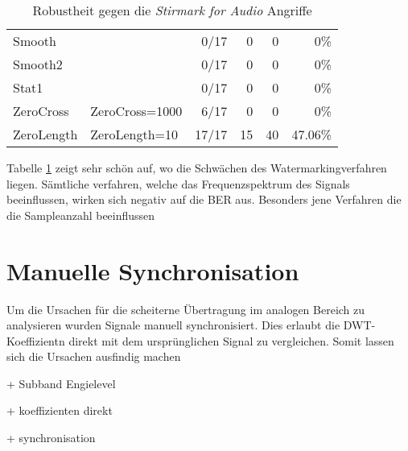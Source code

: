 \begin{table}[h]
\begin{tabular}{llrrrr}
Smooth                               &                                        & 0/17                            & 0                               & 0                                & 0\%                              \\
Smooth2                              &                                        & 0/17                            & 0                               & 0                                & 0\%                              \\
Stat1                                &                                        & 0/17                            & 0                               & 0                                & 0\%                              \\
ZeroCross                            & ZeroCross=1000                         & 6/17                            & 0                               & 0                                & 0\%                              \\
ZeroLength                           & ZeroLength=10                          & 17/17                           & 15                              & 40                               & 47.06\%                          \\ \hline
\end{tabular}

\caption{Robustheit gegen die \textit{Stirmark for Audio} Angriffe}
\label{tab:stirmark}
\end{table}

Tabelle \ref{tab:stirmark} zeigt sehr schön auf, wo die Schwächen des Watermarkingverfahren liegen. Sämtliche verfahren, welche das Frequenzspektrum des Signals beeinflussen, wirken sich negativ auf die BER aus. Besonders jene Verfahren die die Sampleanzahl beeinflussen
 

\section{Manuelle Synchronisation}

Um die Ursachen für die scheiterne Übertragung im analogen Bereich zu analysieren wurden Signale manuell synchronisiert. Dies erlaubt die DWT-Koeffizientn direkt mit dem ursprünglichen Signal zu vergleichen. Somit lassen sich die Ursachen ausfindig machen

+ Subband Engielevel

+ koeffizienten direkt

+ synchronisation


